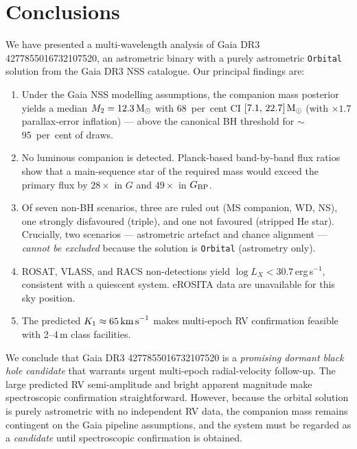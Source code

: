 \documentclass[usenatbib,fleqn]{mnras}
\newcommand{\Msun}{{\rm M}_\odot}
\newcommand{\kms}{{\rm km\,s}^{-1}}
\begin{document}
\section{Conclusions}
\label{sec:conclusions}

We have presented a multi-wavelength analysis of
Gaia DR3 4277855016732107520, an astrometric binary with a purely
astrometric \texttt{Orbital} solution from the Gaia DR3 NSS
catalogue.  Our principal findings are:

\begin{enumerate}
\item Under the Gaia NSS modelling assumptions, the companion mass
  posterior yields a median
  $M_2 = 12.3\,\Msun$ with 68~per~cent CI
  $[7.1,\,22.7]\,\Msun$ (with $\times 1.7$ parallax-error
  inflation) --- above the canonical BH threshold for
  $\sim$\,95~per~cent of draws.

\item No luminous companion is detected.  Planck-based band-by-band
  flux ratios show that a main-sequence star of the required mass
  would exceed the primary flux by $28\times$ in $G$ and
  $49\times$ in $G_{\rm BP}$.

\item Of seven non-BH scenarios, three are ruled out
  (MS companion, WD, NS), one strongly disfavoured (triple),
  and one not favoured (stripped He star).  Crucially, two
  scenarios --- astrometric artefact and chance alignment ---
  \emph{cannot be excluded} because the solution is
  \texttt{Orbital} (astrometry only).

\item ROSAT, VLASS, and RACS non-detections yield
  $\log L_X < 30.7$\,erg\,s$^{-1}$, consistent with a
  quiescent system.  eROSITA data are unavailable for this sky
  position.

\item The predicted $K_1 \approx 65\,\kms$ makes multi-epoch
  RV confirmation feasible with 2--4\,m class facilities.
\end{enumerate}

We conclude that Gaia DR3 4277855016732107520 is a \emph{promising
dormant black hole candidate} that warrants urgent multi-epoch
radial-velocity follow-up.  The large predicted RV semi-amplitude
and bright apparent magnitude make spectroscopic confirmation
straightforward.  However, because the orbital solution is purely
astrometric with no independent RV data, the companion mass remains
contingent on the Gaia pipeline assumptions, and the system must
be regarded as a \emph{candidate} until spectroscopic confirmation
is obtained.
\end{document}
